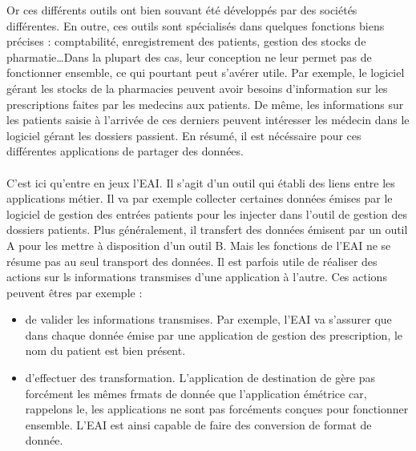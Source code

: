 			\begin{tableau} %
			
			\end{tableau}
			
			Or ces différents outils ont bien souvant été développés par des sociétés
			différentes. En outre, ces outils sont spécialisés dans quelques fonctions
			biens précises : comptabilité, enregistrement des patients, gestion des
			stocks de pharmatie\ldots Dans la plupart des cas, leur conception ne leur
			permet pas de fonctionner ensemble, ce qui pourtant peut s'avérer utile. Par
			exemple, le logiciel gérant les stocks de la pharmacies peuvent avoir besoins
			d'information sur les prescriptions faites par les medecins aux patients. De
			même, les informations sur les patients saisie à l'arrivée de ces derniers
			peuvent intéresser les médecin dans le logiciel gérant les dossiers passient.
			En résumé, il est nécéssaire pour ces différentes applications de partager
			des données.
		
			\paragraph{}%
			C'est ici qu'entre en jeux l'EAI. Il s'agit d'un outil qui établi des liens
			entre les applications métier. Il va par exemple collecter certaines données
			émises par le logiciel de gestion des entrées patients pour les injecter dans
			l'outil de gestion des dossiers patients. Plus généralement, il transfert des données
			émisent par un outil A pour les mettre à disposition d'un outil B.\newline
			Mais les fonctions de l'EAI ne se résume pas au seul transport des
			données. Il est parfois utile de réaliser des actions sur ls informations
			transmises d'une application à l'autre. Ces actions peuvent êtres par exemple
			:\newline
			\begin{itemize}
			  \item de valider les informations transmises. Par exemple, l'EAI va
			  s'assurer que dans chaque donnée émise par une application de gestion des
			  prescription, le nom du patient est bien présent.
			  \item d'effectuer des transformation. L'application de destination de
			  gère pas forcément les mêmes frmats de donnée que l'application émétrice
			  car, rappelons le, les applications ne sont pas forcéments conçues pour
			  fonctionner ensemble. L'EAI est ainsi capable de faire des conversion de
			  format de donnée.
			\end{itemize}

